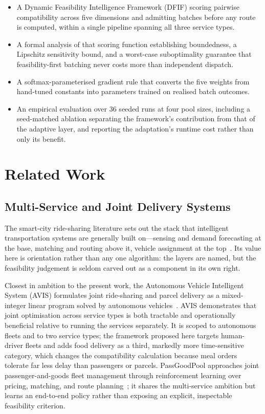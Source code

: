 \documentclass[conference]{IEEEtran}
\begin{document}
\begin{itemize}
\item A Dynamic Feasibility Intelligence Framework (DFIF) scoring pairwise
compatibility across five dimensions and admitting batches before any route
is computed, within a single pipeline spanning all three service types.
\item A formal analysis of that scoring function establishing boundedness, a
Lipschitz sensitivity bound, and a worst-case suboptimality guarantee that
feasibility-first batching never costs more than independent dispatch.
\item A softmax-parameterised gradient rule that converts the five weights
from hand-tuned constants into parameters trained on realised batch outcomes.
\item An empirical evaluation over 36 seeded runs at four pool sizes,
including a seed-matched ablation separating the framework's contribution
from that of the adaptive layer, and reporting the adaptation's runtime cost
rather than only its benefit.
\end{itemize}

\section{Related Work}

\subsection{Multi-Service and Joint Delivery Systems}
The smart-city ride-sharing literature sets out the stack that intelligent
transportation systems are generally built on---sensing and demand
forecasting at the base, matching and routing above it, vehicle assignment at
the top~\cite{seng2023}. Its value here is orientation rather than any one
algorithm: the layers are named, but the feasibility judgement is seldom
carved out as a component in its own right.

Closest in ambition to the present work, the Autonomous Vehicle Intelligent
System (AVIS) formulates joint ride-sharing and parcel delivery as a
mixed-integer linear program solved by autonomous vehicles~\cite{zhang2022}.
AVIS demonstrates that joint optimisation across service types is both
tractable and operationally beneficial relative to running the services
separately. It is scoped to autonomous fleets and to two service types;
the framework proposed here targets human-driver fleets and adds food
delivery as a third, markedly more time-sensitive category, which changes
the compatibility calculation because meal orders tolerate far less delay
than passengers or parcels. PassGoodPool approaches joint passenger-and-goods
fleet management through reinforcement learning over pricing, matching, and
route planning~\cite{manchella2022}; it shares the multi-service ambition but
learns an end-to-end policy rather than exposing an explicit, inspectable
feasibility criterion.
\end{document}
